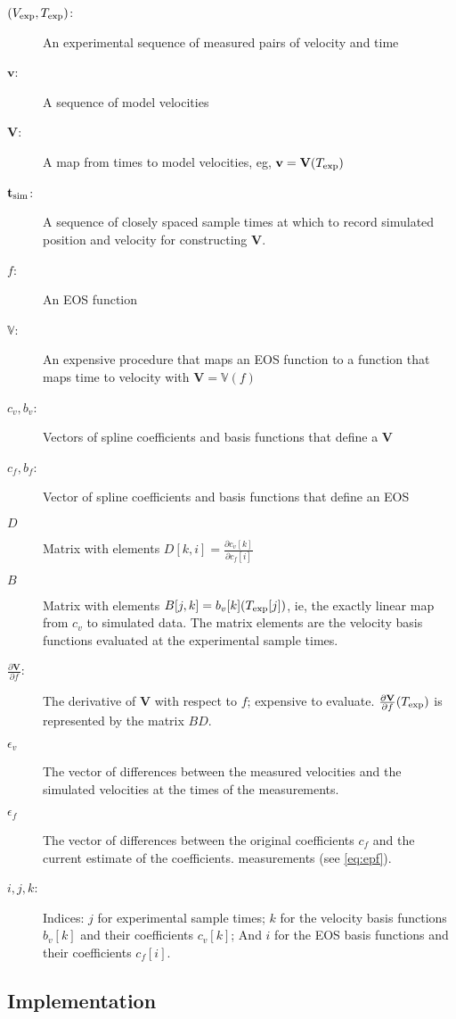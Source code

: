 \documentclass[11pt]{article}
\newcommand{\partiald}[2]{\frac{\partial #1}{\partial #2}}
\newcommand\bv{\mathbf{v}}
\newcommand\Vfunc{\mathbb{V}}
\newcommand\Vt{\mathbf{V}}
\newcommand\vexp{V_{\rm{exp}}}
\newcommand\texp{T_{\rm{exp}}}
\newcommand\cf{c_f}
\newcommand\cv{c_v}
\newcommand\fbasis{b_f}
\newcommand\vbasis{b_v}
\newcommand\tsim{{\mathbf t}_{\rm{sim}}}
\newcommand\DVDf{\partiald{\Vt}{f}}
\newcommand\epv{\epsilon_v}
\newcommand\epf{\epsilon_f}
\begin{document}
\begin{description}
\item[$(\vexp, \texp)$:] An experimental sequence of measured pairs of
  velocity and time
\item[$\bv$:] A sequence of model velocities
\item[$\Vt$:] A map from times to model velocities, eg, $\bv =
  \Vt(\texp)$
\item[$\tsim$:] A sequence of closely spaced sample times at which to record
  simulated position and velocity for constructing $\Vt$.
\item[$f$:] An EOS function
\item[$\Vfunc$:] An expensive procedure that maps an EOS function to a
  function that maps time to velocity with $\Vt = \Vfunc(f)$
\item[$\cv,\vbasis$:] Vectors of spline coefficients and basis functions
  that define a $\Vt$
\item[$\cf,\fbasis$:] Vector of spline coefficients and basis functions
  that define an EOS
\item[$D$] Matrix with elements $D[k,i] = \partiald{\cv[k]}{\cf[i]}$
\item[$B$] Matrix with elements $B[j,k] = \vbasis[k](\texp[j])$, ie,
  the exactly linear map from $c_v$ to simulated data.  The matrix
  elements are the velocity basis functions evaluated at the
  experimental sample times.
\item[$\DVDf$:] The derivative of $\Vt$ with respect to $f$; expensive
  to evaluate.  $\DVDf (\texp)$ is represented by the matrix $BD$.
\item[$\epv$] The vector of differences between the measured
  velocities and the simulated velocities at the times of the
  measurements.
\item[$\epf$] The vector of differences between the original
  coefficients $c_f$ and the current estimate of the coefficients.
  measurements (see \eqref{eq:epf}).
\item[$i,j,k$:] Indices: $j$ for experimental sample times; $k$ for
  the velocity basis functions $\vbasis[k]$ and their coefficients
  $\cv[k]$; And $i$ for the EOS basis functions and their coefficients
  $\cf[i]$.
\end{description}

\subsection{Implementation}
\label{sec:basic_implementation}
\end{document}
